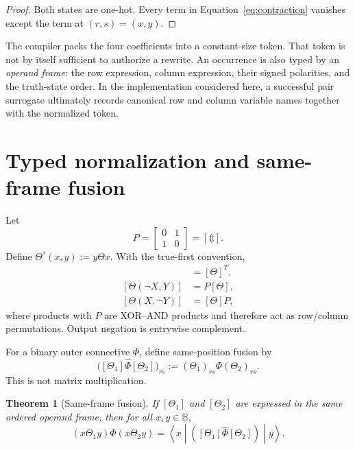 \documentclass[10pt]{article}
\newcommand{\B}{\mathbb B}
\newcommand{\bxor}{\mathbin{\Updownarrow}}
\newcommand{\ptop}[1]{\widehat{#1}}
\theoremstyle{plain}
\newtheorem{theorem}{Theorem}
\theoremstyle{definition}
\theoremstyle{remark}
\begin{document}
\begin{proof}
Both states are one-hot. Every term in Equation~\eqref{eq:contraction} vanishes except the term at $(r,s)=(x,y)$.
\end{proof}

The compiler packs the four coefficients into a constant-size token. That token is not by itself sufficient to authorize a rewrite. An occurrence is also typed by an \emph{operand frame}: the row expression, column expression, their signed polarities, and the truth-state order. In the implementation considered here, a successful pair surrogate ultimately records canonical row and column variable names together with the normalized token.

\section{Typed normalization and same-frame fusion}
\label{sec:alignment}

Let
\begin{equation}
 P=\begin{bmatrix}0&1\\1&0\end{bmatrix}=[\bxor].
\end{equation}
Define $\Theta^\tau(x,y):=y\Theta x$. With the true-first convention,
\begin{align}
 [\Theta^\tau]&=[\Theta]^T, \\
 [\Theta(\neg X,Y)]&=P[\Theta], \\
 [\Theta(X,\neg Y)]&=[\Theta]P,
 \label{eq:input-transforms}
\end{align}
where products with $P$ are XOR--AND products and therefore act as row/column permutations. Output negation is entrywise complement.

For a binary outer connective $\Phi$, define same-position fusion by
\begin{equation}
 \bigl([\Theta_1]\ptop{\Phi}[\Theta_2]\bigr)_{rs}
 :=(\Theta_1)_{rs}\Phi(\Theta_2)_{rs}.
 \label{eq:pointwise}
\end{equation}
This is not matrix multiplication.

\begin{theorem}[Same-frame fusion]
If $[\Theta_1]$ and $[\Theta_2]$ are expressed in the same ordered operand frame, then for all $x,y\in\B$,
\begin{equation}
 (x\Theta_1 y)\Phi(x\Theta_2 y)
 =\left\langle x\middle|
 \left([\Theta_1]\ptop{\Phi}[\Theta_2]\right)
 \middle|y\right\rangle.
 \label{eq:fusion-theorem}
\end{equation}
\end{theorem}
\end{document}
